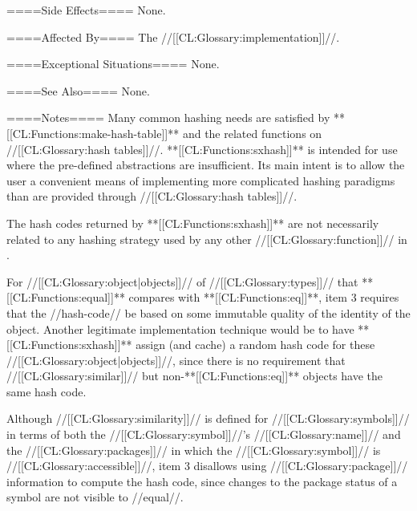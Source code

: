 ====Side Effects====
None.

====Affected By====
The //[[CL:Glossary:implementation]]//.

====Exceptional Situations====
None.

====See Also====
None.

====Notes====
Many common hashing needs are satisfied by **[[CL:Functions:make-hash-table]]** and the related functions on //[[CL:Glossary:hash tables]]//. **[[CL:Functions:sxhash]]** is intended for use where the pre-defined abstractions are insufficient. Its main intent is to allow the user a convenient means of implementing more complicated hashing paradigms than are provided through //[[CL:Glossary:hash tables]]//.

The hash codes returned by **[[CL:Functions:sxhash]]** are not necessarily related to any hashing strategy used by any other //[[CL:Glossary:function]]// in \clisp.

For //[[CL:Glossary:object|objects]]// of //[[CL:Glossary:types]]// that **[[CL:Functions:equal]]** compares with **[[CL:Functions:eq]]**, item 3 requires that the //hash-code// be based on some immutable quality of the identity of the object. Another legitimate implementation technique would be to have **[[CL:Functions:sxhash]]** assign (and cache) a random hash code for these //[[CL:Glossary:object|objects]]//, since there is no requirement that //[[CL:Glossary:similar]]// but non-**[[CL:Functions:eq]]** objects have the same hash code.

Although //[[CL:Glossary:similarity]]// is defined for //[[CL:Glossary:symbols]]// in terms of both the //[[CL:Glossary:symbol]]//'s //[[CL:Glossary:name]]// and the //[[CL:Glossary:packages]]// in which the //[[CL:Glossary:symbol]]// is //[[CL:Glossary:accessible]]//, item 3 disallows using //[[CL:Glossary:package]]// information to compute the hash code, since changes to the package status of a symbol are not visible to //equal//.

